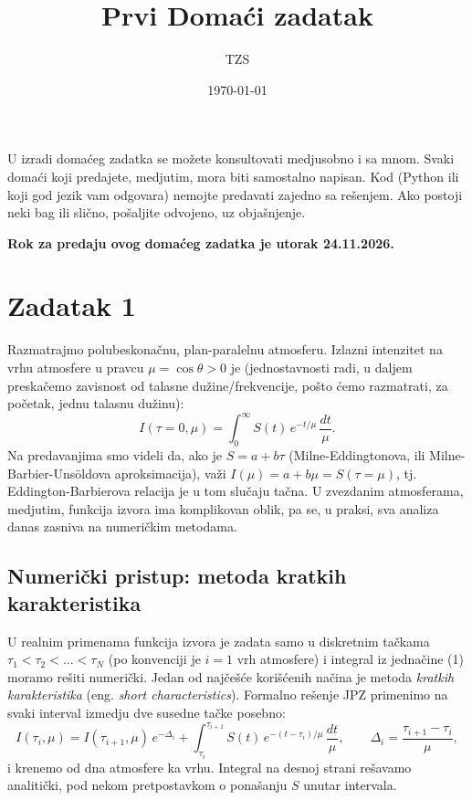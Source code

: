 \documentclass[12pt]{article}
\title{Prvi Doma\'{c}i zadatak}
\author{TZS}
\date{\today}
\begin{document}
\maketitle

U izradi doma\'{c}eg zadatka se mo\v{z}ete konsultovati medjusobno i sa mnom. Svaki doma\'{c}i koji predajete, medjutim, mora biti samostalno napisan. Kod (Python ili koji god jezik vam odgovara) nemojte predavati zajedno sa re\v{s}enjem. Ako postoji neki bag ili sli\v{c}no, po\v{s}aljite odvojeno, uz obja\v{s}njenje.

\textbf{Rok za predaju ovog doma\'{c}eg zadatka je utorak 24.11.2026.}

\section*{Zadatak 1}

Razmatrajmo polubeskona\v{c}nu, plan-paralelnu atmosferu. Izlazni intenzitet na vrhu atmosfere u pravcu $\mu = \cos\theta > 0$ je (jednostavnosti radi, u daljem preska\v{c}emo zavisnost od talasne du\v{z}ine/frekvencije, po\v{s}to \'{c}emo razmatrati, za po\v{c}etak, jednu talasnu du\v{z}inu):
\begin{equation}
I(\tau=0, \mu) = \int_0^\infty S(t)\, e^{-t/\mu}\, \frac{dt}{\mu}.
\end{equation}
Na predavanjima smo videli da, ako je $S = a + b\tau$ (Milne-Eddingtonova, ili Milne-Barbier-Uns\"{o}ldova aproksimacija), va\v{z}i $I(\mu) = a + b\mu = S(\tau = \mu)$, tj. Eddington-Barbierova relacija je u tom slu\v{c}aju ta\v{c}na. U zvezdanim atmosferama, medjutim, funkcija izvora ima komplikovan oblik, pa se, u praksi, sva analiza danas zasniva na numeri\v{c}kim metodama.

\subsection*{Numeri\v{c}ki pristup: metoda kratkih karakteristika}

U realnim primenama funkcija izvora je zadata samo u diskretnim ta\v{c}kama $\tau_1 < \tau_2 < \dots < \tau_N$ (po konvenciji je $i=1$ vrh atmosfere) i integral iz jedna\v{c}ine (1) moramo re\v{s}iti numeri\v{c}ki. Jedan od naj\v{c}e\v{s}\'{c}e kori\v{s}\'{c}enih na\v{c}ina je metoda \emph{kratkih karakteristika} (eng. \emph{short characteristics}). Formalno re\v{s}enje JPZ primenimo na svaki interval izmedju dve susedne ta\v{c}ke posebno:
\begin{equation}
I(\tau_i, \mu) = I(\tau_{i+1}, \mu)\, e^{-\Delta_i} + \int_{\tau_i}^{\tau_{i+1}} S(t)\, e^{-(t-\tau_i)/\mu}\, \frac{dt}{\mu}, \qquad \Delta_i = \frac{\tau_{i+1} - \tau_i}{\mu},
\end{equation}
i krenemo od dna atmosfere ka vrhu. Integral na desnoj strani re\v{s}avamo analiti\v{c}ki, pod nekom pretpostavkom o pona\v{s}anju $S$ unutar intervala.
\end{document}
